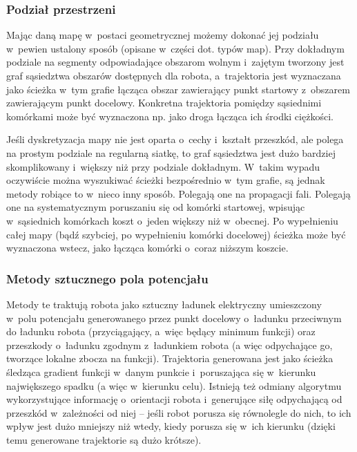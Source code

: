 \subsubsection{Podział przestrzeni}

Mając daną mapę w~postaci geometrycznej możemy dokonać jej podziału w~pewien ustalony
sposób (opisane w~części dot. typów map). Przy dokładnym podziale na segmenty
odpowiadające obszarom wolnym i~zajętym tworzony jest graf sąsiedztwa obszarów dostępnych
dla robota, a~trajektoria jest wyznaczana jako ścieżka w~tym grafie łącząca obszar
zawierający punkt startowy z~obszarem zawierającym punkt docelowy. Konkretna trajektoria
pomiędzy sąsiednimi komórkami może być wyznaczona np. jako droga łącząca ich środki ciężkości.

Jeśli dyskretyzacja mapy nie jest oparta o~cechy i~kształt przeszkód, ale polega na
prostym podziale na regularną siatkę, to graf sąsiedztwa jest dużo bardziej skomplikowany
i~większy niż przy podziale dokładnym. W~takim wypadu oczywiście można wyszukiwać
ścieżki bezpośrednio w~tym grafie, są jednak metody robiące to w~nieco inny sposób.
Polegają one na propagacji fali. Polegają one na systematycznym poruszaniu się
od komórki startowej, wpisując w~sąsiednich komórkach koszt o~jeden większy niż w~obecnej.
Po wypełnieniu całej mapy (bądź szybciej, po wypełnieniu komórki docelowej) ścieżka
może być wyznaczona wstecz, jako łącząca komórki o~coraz niższym koszcie.

\subsubsection{Metody sztucznego pola potencjału}

Metody te traktują robota jako sztuczny ładunek elektryczny umieszczony w~polu potencjału
generowanego przez punkt docelowy o~ładunku przeciwnym do ładunku robota
(przyciągający, a~więc będący minimum funkcji) oraz przeszkody o~ładunku zgodnym
z~ładunkiem robota (a więc odpychające go, tworzące lokalne zbocza na funkcji).
Trajektoria generowana jest jako ścieżka śledząca gradient funkcji w~danym punkcie
i~poruszająca się w~kierunku największego spadku (a więc w~kierunku celu). Istnieją
też odmiany algorytmu wykorzystujące informację o~orientacji robota i~generujące
siłę odpychającą od przeszkód w~zależności od niej -- jeśli robot porusza się równolegle
do nich, to ich wpływ jest dużo mniejszy niż wtedy, kiedy porusza się w~ich kierunku
(dzięki temu generowane trajektorie są dużo krótsze).

